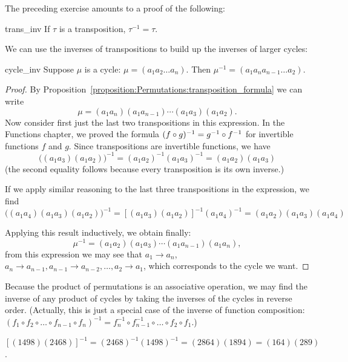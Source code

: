 \noindent
The preceding exercise amounts to a proof of the following:

\begin{prop}{trans_inv}
If $\tau$ is a transposition, $\tau^{-1} = \tau$.
\end{prop}

We can use the inverses of transpositions to build up the inverses of larger cycles:

\begin{prop}{cycle_inv}
Suppose $\mu$ is a cycle: $\mu = (a_1 a_2 \ldots  a_n)$. Then $\mu^{-1} = (a_1 a_n a_{n-1}  \ldots a_2 )$.
\end{prop}

\begin{proof}
By Proposition~\ref{proposition:Permutations:transposition_formula} we can write 
\[ \mu = (a_1 a_n ) (a_1 a_{n-1} ) \cdots ( a_1 a_3) (a_1 a_2).
\]
Now consider first just the last two transpositions in this expression.
In the Functions chapter, we proved the formula  $(f \circ g)^{-1} = g^{-1} \circ f^{-1}$ for invertible functions $f$ and $g$.
Since transpositions are invertible functions, we have
\[
{\Big(}(a_1 a_3)(a_1 a_2){\Big)}^{-1} = (a_1 a_2)^{-1} ( a_1 a_3)^{-1} = (a_1 a_2 ) (a_1 a_3 ) \]
(the second equality follows because every transposition is its own inverse.)

If we apply similar reasoning to the last three transpositions in the expression, we find
\[
{\Big(}(a_1 a_4)(a_1 a_3)(a_1 a_2){\Big)}^{-1} = [(a_1 a_3)(a_1 a_2)]^{-1} ( a_1 a_4)^{-1} = (a_1 a_2 ) (a_1 a_3 ) (a_1 a_4) \]

 Applying this result inductively, we obtain finally: 
\[
\mu^{-1} = (a_1 a_2) ( a_1 a_3) \cdots (a_1 a_{n-1} ) (a_1 a_n ), \]
from this expression we may see that $a_1 \rightarrow a_n$, $a_n \rightarrow a_{n-1}, a_{n-1} \rightarrow a_{n-2}, \ldots, a_{2} \rightarrow a_{1}$, which 
corresponds to the cycle we want.
\end{proof}

Because the product of permutations is an associative operation, we may find the inverse of any product of cycles by taking the inverses of the cycles in reverse order. (Actually, this is just a special case of the inverse of function composition: $(f_1 \circ f_2 \circ \ldots \circ f_{n-1}\circ f_n)^{-1}= f_n^{-1} \circ f_{n-1}^{-1} \circ \ldots  \circ f_2 \circ f_1 $.)

\begin{example}{}
$\left[ ( 1 4 9 8 )( 2 4 6 8 ) \right] ^{-1} = ( 2 4 6 8 )^{-1}( 1 4 9 8 )^{-1} = ( 2 8 6 4 )(1 8 9 4) = ( 1 6 4)( 2 8 9)$. 
\end{example}

